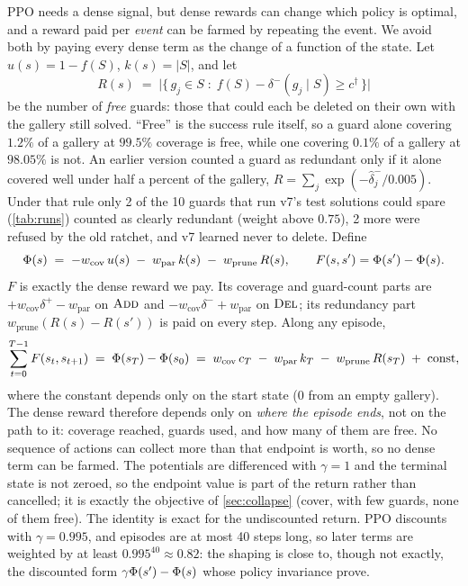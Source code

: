 \documentclass[11pt,a4paper]{article}
\begin{document}
PPO needs a dense signal, but dense rewards can change which policy is optimal, and a
reward paid per \emph{event} can be farmed by repeating the event. We avoid both by paying
every dense term as the change of a function of the state. Let $u(s) = 1 - f(S)$,
$k(s)=\lvert S\rvert$, and let
\[
  R(s) \;=\; \bigl\lvert\{\, g_j \in S \;:\; f(S) - \delta^-(g_j\mid S) \ge c^\dagger \,\}\bigr\rvert
\]
be the number of \emph{free} guards: those that could each be deleted on their own with the
gallery still solved. ``Free'' is the success rule itself, so a guard alone covering $1.2\%$ of
a gallery at $99.5\%$ coverage is free, while one covering $0.1\%$ of a gallery at $98.05\%$ is
not. An earlier version counted a guard as redundant only if it alone covered well under half
a percent of the gallery, $R=\sum_j\exp(-\hat\delta^-_j/0.005)$. Under that rule only 2 of
the 10 guards that run v7's test solutions could spare (\cref{tab:runs}) counted as clearly redundant (weight above
$0.75$), 2 more were refused by the old ratchet, and v7 learned never to delete. Define
\[
  \Phi(s) \;=\; -w_{\mathrm{cov}}\,u(s) \;-\; w_{\mathrm{par}}\,k(s) \;-\; w_{\mathrm{prune}}\,R(s),
  \qquad
  F(s,s') = \Phi(s') - \Phi(s).
\]
$F$ is exactly the dense reward we pay. Its coverage and guard-count parts are
$+w_{\mathrm{cov}}\delta^+ - w_{\mathrm{par}}$ on $\textsc{Add}$ and $-w_{\mathrm{cov}}\delta^- +
w_{\mathrm{par}}$ on $\textsc{Del}$; its redundancy part $w_{\mathrm{prune}}(R(s)-R(s'))$ is paid on
every step. Along any episode,
\[
  \sum_{t=0}^{T-1} F(s_t,s_{t+1}) \;=\; \Phi(s_T) - \Phi(s_0)
  \;=\; w_{\mathrm{cov}}\,c_T \;-\; w_{\mathrm{par}}\,k_T \;-\; w_{\mathrm{prune}}\,R(s_T) \;+\; \text{const},
\]
where the constant depends only on the start state ($0$ from an empty gallery). The dense
reward therefore depends only on \emph{where the episode ends}, not on the path to it:
coverage reached, guards used, and how many of them are free. No sequence of actions
can collect more than that endpoint is worth, so no dense term can be farmed. The potentials
are differenced with $\gamma=1$ and the terminal state is not zeroed, so the endpoint value is
part of the return rather than cancelled; it is exactly the objective of \cref{sec:collapse}
(cover, with few guards, none of them free). The identity is exact for
the undiscounted return. PPO discounts with $\gamma=0.995$, and episodes are at most 40
steps long, so later terms are weighted by at least $0.995^{40}\approx0.82$: the shaping is
close to, though not exactly, the discounted form $\gamma\Phi(s')-\Phi(s)$ whose policy
invariance \citet{ng1999} prove.
\end{document}
